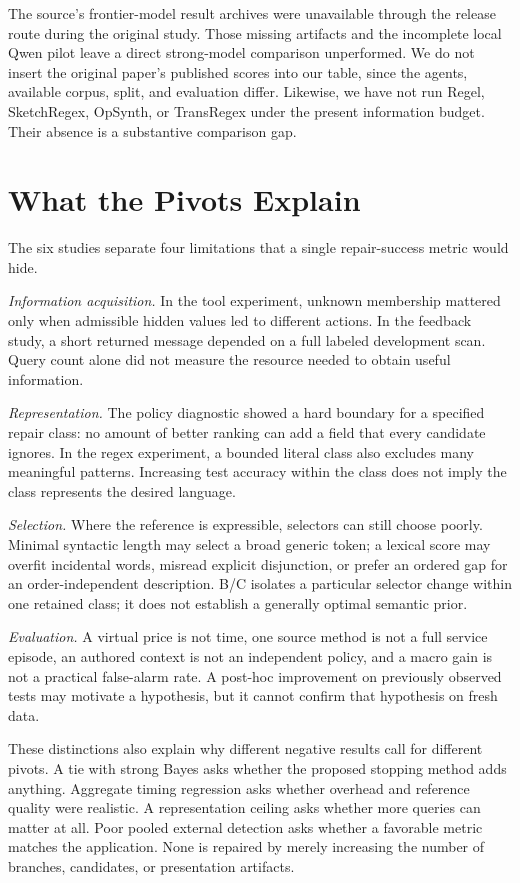 \documentclass[10pt,twocolumn,letterpaper]{article}
\begin{document}
The source's frontier-model result archives were unavailable through the release route during the original study. Those missing artifacts and the incomplete local Qwen pilot leave a direct strong-model comparison unperformed. We do not insert the original paper's published scores into our table, since the agents, available corpus, split, and evaluation differ. Likewise, we have not run Regel, SketchRegex, OpSynth, or TransRegex under the present information budget. Their absence is a substantive comparison gap.

\section{What the Pivots Explain}
\label{sec:interpretation}
The six studies separate four limitations that a single repair-success metric would hide.

\emph{Information acquisition.} In the tool experiment, unknown membership mattered only when admissible hidden values led to different actions. In the feedback study, a short returned message depended on a full labeled development scan. Query count alone did not measure the resource needed to obtain useful information.

\emph{Representation.} The policy diagnostic showed a hard boundary for a specified repair class: no amount of better ranking can add a field that every candidate ignores. In the regex experiment, a bounded literal class also excludes many meaningful patterns. Increasing test accuracy within the class does not imply the class represents the desired language.

\emph{Selection.} Where the reference is expressible, selectors can still choose poorly. Minimal syntactic length may select a broad generic token; a lexical score may overfit incidental words, misread explicit disjunction, or prefer an ordered gap for an order-independent description. B/C isolates a particular selector change within one retained class; it does not establish a generally optimal semantic prior.

\emph{Evaluation.} A virtual price is not time, one source method is not a full service episode, an authored context is not an independent policy, and a macro gain is not a practical false-alarm rate. A post-hoc improvement on previously observed tests may motivate a hypothesis, but it cannot confirm that hypothesis on fresh data.

These distinctions also explain why different negative results call for different pivots. A tie with strong Bayes asks whether the proposed stopping method adds anything. Aggregate timing regression asks whether overhead and reference quality were realistic. A representation ceiling asks whether more queries can matter at all. Poor pooled external detection asks whether a favorable metric matches the application. None is repaired by merely increasing the number of branches, candidates, or presentation artifacts.
\end{document}
